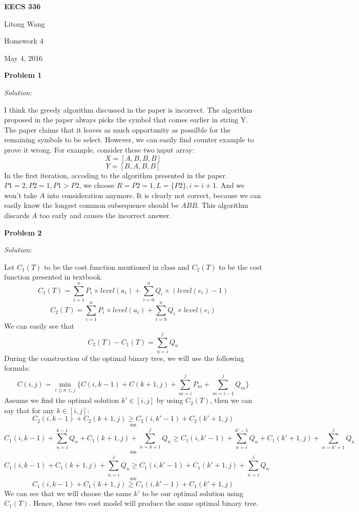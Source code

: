\documentclass[12pt,letterpaper]{article}
\def\pp{\par\noindent}
\newcommand{\problem}[1]{ \bigskip \pp \textbf{Problem #1}\par}
\newcommand{\solution}{\textit{Solution:}\par}
\begin{document}
\centerline{\bf EECS 336}

\medskip
\centerline{Litong Wang}
\centerline{Homework 4}
\centerline{May 4, 2016}
\bigskip


\problem{1}
\solution
I think the greedy algorithm discussed in the paper is incorrect. The algorithm proposed in the paper always picks the symbol that comes earlier in string Y. \\
The paper claims that it leaves as much opportunity as possilble for the remaining symbols to be select. However, we can easily find counter example to prove it wrong. For example, consider these two input array: \\
$$X = [A,B,B,B]$$
$$Y = [B,A,B,B]$$
In the first iteration, accoding to the algorithm presented in the paper. $P1 = 2, P2 = 1, P1 > P2$, we choose $R = P2 = 1, L = \{ P2 \}, i = i + 1$. And we won't take $A$ into consideration anymore. It is clearly not correct, because we can easily know the longest common subsequence should be $ABB$. This algorithm discards $A$ too early and causes the incorrect answer. 

\problem{2}
\solution
Let $C_1(T)$ to be the cost function mentioned in class and $C_2(T)$ to be the cost function presented in textbook. \\
$$C_1(T) = \sum_{i=1}^{n} P_i \times level(a_i) + \sum_{i=0}^{n} Q_i \times (level(e_i)-1) $$
$$C_2(T) = \sum_{i=1}^{n} P_i \times level(a_i) + \sum_{i=0}^{n} Q_i \times level(e_i) $$
We can easily see that \\ 
$$C_2(T) - C_1(T) = \sum_{ n = i }^{j} Q_n$$
During the construction of the optimal binary tree, we will use the following formula: \\
$$C(i,j) = \min_{i \le n \le j} \lbrace C(i,k-1) + C(k+1,j) + \sum_{m = i}^{j} P_m + \sum_{m = i - 1}^{j} Q_m \rbrace$$
Assume we find the optimal solution $k' \in [i,j] $ by using $C_2(T)$, then we can say that for any $k \in [i,j]$: \\
$$C_2(i,k-1) + C_2(k+1,j) \ge C_2(i,k'-1) + C_2(k'+1,j)$$
$$\Leftrightarrow$$
$$C_1(i,k-1) + \sum_{ n = i }^{k-1} Q_n + C_1(k+1,j) + \sum_{ n = k+1 }^{j} Q_n \ge C_1(i,k'-1) + \sum_{ n = i }^{k'-1} Q_n + C_1(k'+1,j) + \sum_{ n = k'+1 }^{j} Q_n$$
$$\Leftrightarrow$$
$$C_1(i,k-1) +  C_1(k+1,j) + \sum_{ n = i }^{j} Q_n \ge C_1(i,k'-1) + C_1(k'+1,j) + \sum_{ n = i }^{j} Q_n$$
$$\Leftrightarrow$$
$$C_1(i,k-1) + C_1(k+1,j) \ge C_1(i,k'-1) + C_1(k'+1,j)$$
We can see that we will choose the same $k'$ to be our optimal solution using $C_1(T)$. Hence, these two cost model will produce the same optimal binary tree.
\end{document}
